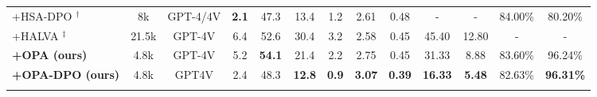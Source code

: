 \begin{table}[t]
{\begin{tabular}{lcc|cccccccccc}
+HSA-DPO \cite{xiao2024hsadpo}$^\dagger$ & 8k & GPT-4/4V & \textbf{2.1} & 47.3 & 13.4 & 1.2 & 2.61 & 0.48 & - & - & 84.00\% & 80.20\% \\
+HALVA \cite{sarkar2024halva}$^\ddagger$ & 21.5k & GPT-4V & 6.4 & 52.6 & 30.4 & 3.2 & 2.58 & 0.45 & 45.40 & 12.80 & - & - \\
\rowcolor[HTML]{ECF4FF}
\textbf{+OPA (ours)} & 4.8k & GPT-4V & 5.2 & \textbf{54.1} & 21.4 & 2.2 & 2.75 & 0.45 & 31.33 & 8.88 & 83.60\% & 96.24\% \\
\rowcolor[HTML]{ECF4FF}
\textbf{+OPA-DPO (ours)} & 4.8k & GPT4V & 2.4 & 48.3 & \textbf{12.8} & \textbf{0.9} & \textbf{3.07} & \textbf{0.39} & \textbf{16.33} & \textbf{5.48} & 82.63\% & \textbf{96.31\%} \\ \addlinespace \hline
\end{tabular}
}
\vspace{-2mm}
\end{table}

